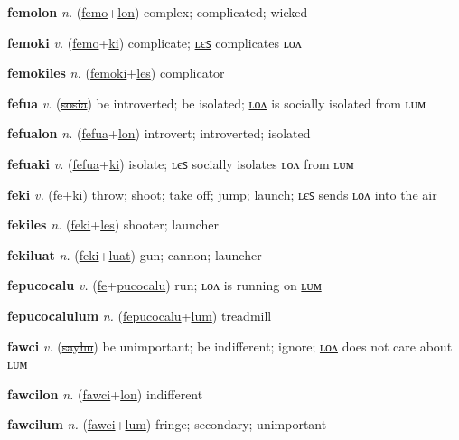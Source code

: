 \textbf{\hypertarget{femolon}{femolon}} \textit{n.} (\hyperlink{femo}{femo}+\allowbreak \hyperlink{lon}{lon})
complex; complicated; wicked

\textbf{\hypertarget{femoki}{femoki}} \textit{v.} (\hyperlink{femo}{femo}+\allowbreak \hyperlink{ki}{ki})
complicate; \hyperlink{femokiles}{ʟєꜱ} complicates ʟᴏᴧ

\textbf{\hypertarget{femokiles}{femokiles}} \textit{n.} (\hyperlink{femoki}{femoki}+\allowbreak \hyperlink{les}{les})
complicator

\textbf{\hypertarget{fefua}{fefua}} \textit{v.} (\hyperlink{sosia}{\sout{sosia}})
be introverted; be isolated; \hyperlink{fefualon}{ʟᴏᴧ} is socially isolated from ʟᴜᴍ

\textbf{\hypertarget{fefualon}{fefualon}} \textit{n.} (\hyperlink{fefua}{fefua}+\allowbreak \hyperlink{lon}{lon})
introvert; introverted; isolated

\textbf{\hypertarget{fefuaki}{fefuaki}} \textit{v.} (\hyperlink{fefua}{fefua}+\allowbreak \hyperlink{ki}{ki})
isolate; ʟєꜱ socially isolates ʟᴏᴧ from ʟᴜᴍ

\textbf{\hypertarget{feki}{feki}} \textit{v.} (\hyperlink{fe}{fe}+\allowbreak \hyperlink{ki}{ki})
throw; shoot; take off; jump; launch; \hyperlink{fekiles}{ʟєꜱ} sends ʟᴏᴧ into the air

\textbf{\hypertarget{fekiles}{fekiles}} \textit{n.} (\hyperlink{feki}{feki}+\allowbreak \hyperlink{les}{les})
shooter; launcher

\textbf{\hypertarget{fekiluat}{fekiluat}} \textit{n.} (\hyperlink{feki}{feki}+\allowbreak \hyperlink{luat}{luat})
gun; cannon; launcher

\textbf{\hypertarget{fepucocalu}{fepucocalu}} \textit{v.} (\hyperlink{fe}{fe}+\allowbreak \hyperlink{pucocalu}{pucocalu})
run; ʟᴏᴧ is running on \hyperlink{fepucocalulum}{ʟᴜᴍ}

\textbf{\hypertarget{fepucocalulum}{fepucocalulum}} \textit{n.} (\hyperlink{fepucocalu}{fepucocalu}+\allowbreak \hyperlink{lum}{lum})
treadmill

\textbf{\hypertarget{fawci}{fawci}} \textit{v.} (\hyperlink{sayhu}{\sout{sayhu}})
be unimportant; be indifferent; ignore; \hyperlink{fawcilon}{ʟᴏᴧ} does not care about \hyperlink{fawcilum}{ʟᴜᴍ}

\textbf{\hypertarget{fawcilon}{fawcilon}} \textit{n.} (\hyperlink{fawci}{fawci}+\allowbreak \hyperlink{lon}{lon})
indifferent

\textbf{\hypertarget{fawcilum}{fawcilum}} \textit{n.} (\hyperlink{fawci}{fawci}+\allowbreak \hyperlink{lum}{lum})
fringe; secondary; unimportant

